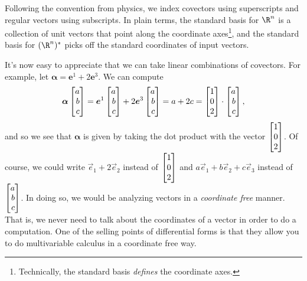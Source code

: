 Following the convention from physics, we index covectors using superscripts
and regular vectors using subscripts.  In plain terms, the standard basis for
$\R^n$ is a collection of unit vectors that point along the coordinate axes\footnote{
Technically, the standard basis \emph{defines} the coordinate axes.}, and the
standard basis for $(\R^n)^*$ picks off the standard coordinates of input
vectors.

It's now easy to appreciate that we can take linear combinations of covectors.
For example, let $\bm \alpha = \bm e^1+2\bm e^3$.  We can compute
\[
	\bm \alpha\mat{a\\b\\c} = \bm e^1\mat{a\\b\\c}
	+2\bm e^3\mat{a\\b\\c} = a+2c = \mat{1\\0\\2}\cdot \mat{a\\b\\c},
\]
and so we see that $\bm\alpha$ is given by taking the dot product with
the vector $\mat{1\\0\\2}$.  Of course, we could write $\vec e_1+2\vec e_2$
instead of $\mat{1\\0\\2}$ and $a\vec e_1+b\vec e_2+c\vec e_3$ instead of 
$\mat{a\\b\\c}$.  In doing so, we would be analyzing vectors in
a \emph{coordinate free} manner.  That is, we never need to talk about
the coordinates of a vector in order to do a computation.  One of the selling points
of differential forms is that they allow you to do multivariable calculus
in a coordinate free way.

